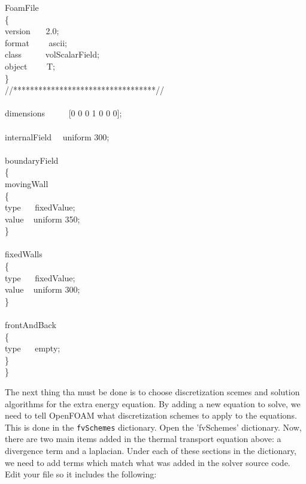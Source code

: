 \documentclass{article}
\newcommand\tab[1][0.5cm]{\hspace*{#1}}
\begin{document}
\begin{enumerate}
\begin{myframe}
{	FoamFile\\
	\{\\
		\tab version\tab ~~~ 2.0;\\
		\tab format\tab ~~~~ ascii;\\
		\tab class\tab ~~~~~ volScalarField; \\
		\tab object\tab ~~~~ T; \\
	\} \\
	//**********************************// \\
	\\
	dimensions\tab\tab ~~~~~ [0 0 0 1 0 0 0];\\
	\\
	internalField\tab\tab ~~  uniform 300;\\
	\\
	boundaryField\\
	\{\\
	\tab movingWall\\
	\tab \{\\
		\tab \tab type \tab \tab   \tab ~~  fixedValue;\\
		\tab \tab value \tab \tab   \tab ~  uniform 350;\\
	\tab \}\\
	\\
	\tab fixedWalls\\
	\tab \{\\
		\tab \tab type    \tab \tab \tab  ~~ fixedValue;\\
		\tab \tab value  \tab \tab \tab  ~  uniform 300;\\
	\tab\}\\
	\\
	\tab frontAndBack\\
	\tab \{\\
		\tab \tab type   \tab \tab \tab   ~~  empty;\\
	\tab \}\\
	\}\\
	
	}
\end{myframe}
	
	
	The next thing tha must be done is to choose discretization scemes and solution algorithms for the extra energy equation. By adding a new equation to solve, we need to tell OpenFOAM what discretization schemes to apply to the equations. This is done in the {\tt fvSchemes} dictionary. Open the 'fvSchemes' dictionary. Now, there are two main items added in the thermal transport equation above: a divergence term and a laplacian. Under each of these sections in the dictionary, we need to add terms which match what was added in the solver source code. Edit your file so it includes the following: 
	

\end{enumerate}
\end{document}
